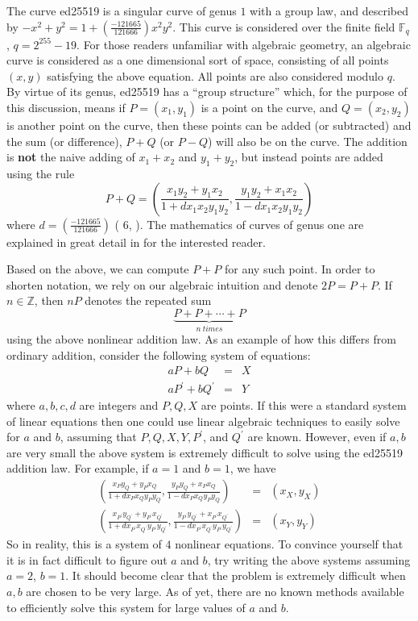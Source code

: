 \documentclass[12pt,english]{mrl}
\numberwithin{equation}{section}
\numberwithin{figure}{section}
\begin{document}
The curve ed25519 is a singular curve of genus $1$ with
a group law, and described by $-x^{2}+y^{2}=1+\left(\frac{-121665}{121666}\right)x^{2}y^{2}$.
This curve is considered over the finite field $\mathbb{F}_{q}$,
$q=2^{255}-19$. For those readers unfamiliar with algebraic geometry,
an algebraic curve is considered as a one dimensional sort of space, consisting
of all points $\left(x,y\right)$ satisfying the above equation. All
points are also considered modulo $q$. By virtue of its genus, ed25519
has a ``group structure'' which, for the purpose of this discussion, means if $P=\left(x_{1},y_{1}\right)$
is a point on the curve, and $Q=\left(x_{2},y_{2}\right)$ is another
point on the curve, then these points can be added (or subtracted) and the sum (or difference), $P+Q$ (or $P-Q$)
will also be on the curve. The addition is \textbf{not} the naive
adding of $x_{1}+x_{2}$ and $y_{1}+y_{2}$, but instead points are
added using the rule 
\[
P+Q=\left(\frac{x_{1}y_{2}+y_{1}x_{2}}{1+dx_{1}x_{2}y_{1}y_{2}},\frac{y_{1}y_{2}+x_{1}x_{2}}{1-dx_{1}x_{2}y_{1}y_{2}}\right)
\]
 where $d=\left(\frac{-121665}{121666}\right)$ (\cite{BBJLP} 6,
\cite{BCPM}). The mathematics of curves of genus one are explained
in great detail in \cite{Si} for the interested reader. 

Based on the above, we can compute $P+P$ for any
such point. In order to shorten notation, we rely on our algebraic intuition and denote $2P = P + P$.
If $n\in\mathbb{Z}$, then $nP$ denotes the repeated sum $$\underbrace{P+P+\cdots+P}_{n\ times}$$
using the above nonlinear addition law. As an example of how this
differs from ordinary addition, consider the following system of equations:
\begin{eqnarray*}
aP+bQ&=&X \\
aP^{\prime}+bQ^{\prime}&=&Y
\end{eqnarray*}
 where $a,b,c,d$ are integers and $P,Q,X$ are points. If this were a standard
 system of linear equations then one could use linear algebraic techniques
to easily solve for $a$ and $b$, assuming that $P,Q,X,Y,P^{\prime}$,
and $Q^{\prime}$ are known. However, even if $a,b$ are very small
the above system is extremely difficult to solve using the ed25519
addition law. For example, if $a=1$ and $b=1$, we have 
\begin{eqnarray*}
\left(\frac{x_{P}y_{Q}+y_{P}x_{Q}}{1+dx_{P}x_{Q}y_{P}y_{Q}},\frac{y_{P}y_{Q}+x_{P}x_{Q}}{1-dx_{P}x_{Q}y_{P}y_{Q}}\right)&=&\left(x_{X},y_{X}\right) \\
\left(\frac{x_{P^{\prime}}y_{Q^{\prime}}+y_{P^{\prime}}x_{Q^{\prime}}}{1+dx_{P^{\prime}}x_{Q^{\prime}}y_{P^{\prime}}y_{Q^{\prime}}},\frac{y_{P^{\prime}}y_{Q^{\prime}}+x_{P^{\prime}}x_{Q^{\prime}}}{1-dx_{P^{\prime}}x_{Q^{\prime}}y_{P^{\prime}}y_{Q^{\prime}}}\right)&=&\left(x_{Y},y_{Y}\right)
\end{eqnarray*}
 So in reality, this is a system of $4$ nonlinear equations. To convince
yourself that it is in fact difficult to figure out $a$ and $b$,
try writing the above systems assuming $a=2$, $b=1$. It should become
clear that the problem is extremely difficult when $a,b$ are chosen
to be very large. As of yet, there are no known methods available to
efficiently solve this system for large values of $a$ and $b$.
\end{document}
